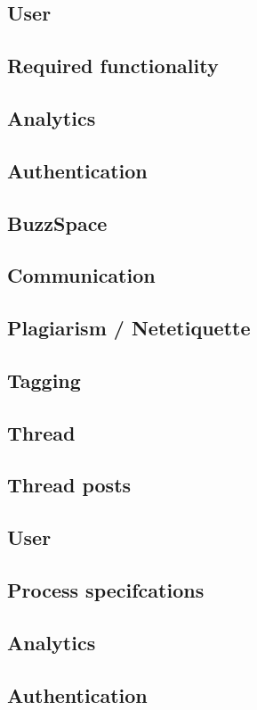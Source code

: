 \documentclass [a4paper,12pt] {article}
\begin{document}
		\subsection*{User}
\pagebreak
	\subsection{Required functionality}
		\subsection*{Analytics}
		\subsection*{Authentication}
		\subsection*{BuzzSpace}
		\subsection*{Communication}
		\subsection*{Plagiarism / Netetiquette}
		\subsection*{Tagging}
		\subsection*{Thread}
		\subsection*{Thread posts}
		\subsection*{User}
\pagebreak
	\subsection{Process specifcations}
		\subsection*{Analytics}
		\subsection*{Authentication}
\end{document}
